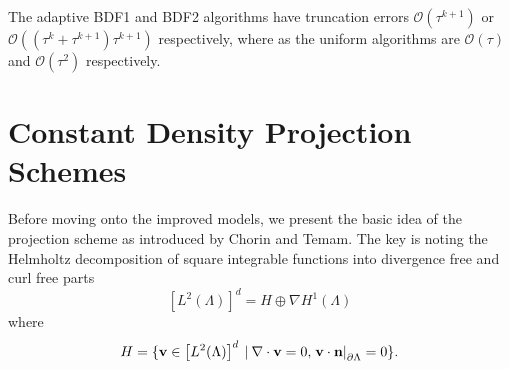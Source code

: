 \documentclass[letterpaper]{erdc}
\begin{document}
The adaptive BDF1 and BDF2 algorithms have truncation errors
$\mathcal{O}\left(\tau^{k+1}\right)$ or
$\mathcal{O}\left(\left(\tau^{k}+\tau^{k+1} \right)\tau^{k+1} \right)$
respectively, where as the uniform algorithms are $\mathcal{O}(\tau)$ and
$\mathcal{O}(\tau^{2})$ respectively.
  

%
%
%
\section{Constant Density Projection Schemes}

Before moving onto the improved models, we present the basic idea of the
projection scheme as introduced by Chorin and Temam.  The key is noting the
Helmholtz decomposition of square integrable functions into divergence free and
curl free parts
\begin{equation}
\left[ L^2(\Lambda)\right]^d = H \oplus \nabla H^1(\Lambda)
\end{equation}
where
\begin{equation}
H = \{ \textbf{v}\in \left[ L^2(\Lambda)\right]^d \:|\: \nabla\cdot \textbf{v} = 0, \left.\textbf{v}\cdot\textbf{n} \right|_{\partial\Lambda} = 0  \}.
\end{equation}
\end{document}
